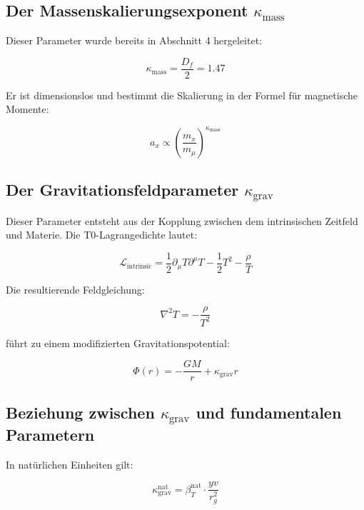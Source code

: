 \documentclass[12pt,a4paper]{article}
\theoremstyle{definition}
\begin{document}
	\subsection{Der Massenskalierungsexponent $\kappa_{\text{mass}}$}
	
	Dieser Parameter wurde bereits in Abschnitt 4 hergeleitet:
	
	\begin{equation}
		\kappa_{\text{mass}} = \frac{D_f}{2} = 1.47
	\end{equation}
	
	Er ist dimensionslos und bestimmt die Skalierung in der Formel f\"ur magnetische Momente:
	
	\begin{equation}
		a_x \propto \left(\frac{m_x}{m_\mu}\right)^{\kappa_{\text{mass}}}
	\end{equation}
	
	\subsection{Der Gravitationsfeldparameter $\kappa_{\text{grav}}$}
	
	Dieser Parameter entsteht aus der Kopplung zwischen dem intrinsischen Zeitfeld und Materie. Die T0-Lagrangedichte lautet:
	
	\begin{equation}
		\mathcal{L}_{\text{intrinsic}} = \frac{1}{2}\partial_\mu T \partial^\mu T - \frac{1}{2}T^2 - \frac{\rho}{T}
	\end{equation}
	
	Die resultierende Feldgleichung:
	
	\begin{equation}
		\nabla^2 T = -\frac{\rho}{T^2}
	\end{equation}
	
	f\"uhrt zu einem modifizierten Gravitationspotential:
	
	\begin{equation}
		\Phi(r) = -\frac{GM}{r} + \kappa_{\text{grav}} r
	\end{equation}
	
	\subsection{Beziehung zwischen $\kappa_{\text{grav}}$ und fundamentalen Parametern}
	
	In nat\"urlichen Einheiten gilt:
	
	\begin{equation}
		\kappa_{\text{grav}}^{\text{nat}} = \beta_T^{\text{nat}} \cdot \frac{yv}{r_g^2}
	\end{equation}
	
\end{document}
